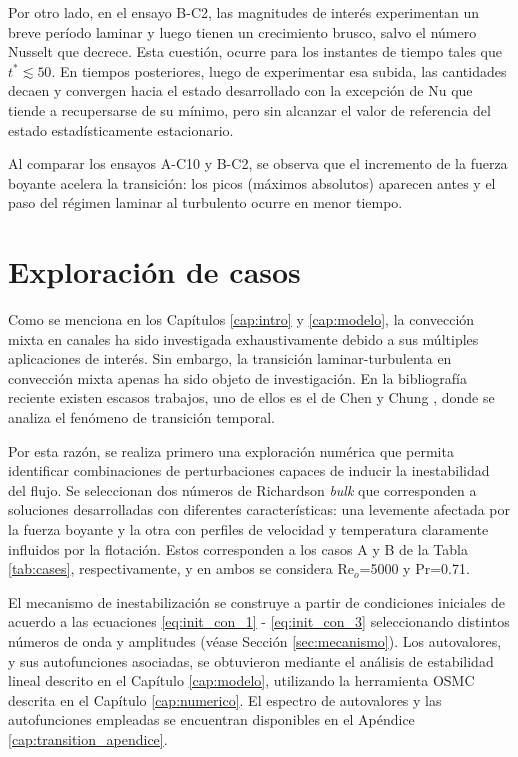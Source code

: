 Por otro lado, en el ensayo B-C2, las magnitudes de interés experimentan un breve período laminar y luego tienen un crecimiento brusco, salvo el número Nusselt que decrece. Esta cuestión, ocurre para los instantes de tiempo tales que $t^*\lesssim 50$. En tiempos posteriores, luego de experimentar esa subida, las cantidades decaen y convergen hacia el estado desarrollado con la excepción de Nu que tiende a recupersarse de su mínimo, pero sin alcanzar el valor de referencia del estado estadísticamente estacionario. 

Al comparar los ensayos A-C10 y B-C2, se observa que el incremento de la fuerza boyante acelera la transición: los picos (máximos absolutos) aparecen antes y el paso del régimen laminar al turbulento ocurre en menor tiempo.

\newpage

\section{Exploración de casos}

Como se menciona en los Capítulos \ref{cap:intro} y \ref{cap:modelo}, la convección mixta en canales ha sido investigada exhaustivamente debido a sus múltiples aplicaciones de interés. Sin embargo, la transición laminar-turbulenta en convección mixta apenas ha sido objeto de investigación. En la bibliografía reciente existen escasos trabajos, uno de ellos es el de Chen y Chung \cite{chen2003direct}, donde se analiza el fenómeno de transición temporal.

Por esta razón, se realiza primero una exploración numérica que permita identificar combinaciones de perturbaciones capaces de inducir la inestabilidad del flujo. Se seleccionan dos números de Richardson \textit{bulk} que corresponden a soluciones desarrolladas con diferentes características: una levemente afectada por la fuerza boyante y la otra con perfiles de velocidad y temperatura claramente influidos por la flotación. Estos corresponden a los casos A y B de la Tabla \ref{tab:cases}, respectivamente, y en ambos se considera Re$_o$=5000 y Pr=0.71.

El mecanismo de inestabilización se construye a partir de condiciones iniciales de acuerdo a las ecuaciones \ref{eq:init_con_1} - \ref{eq:init_con_3} seleccionando distintos números de onda y amplitudes (véase Sección \ref{sec:mecanismo}). Los autovalores, y sus autofunciones asociadas, se obtuvieron mediante el análisis de estabilidad lineal descrito en el Capítulo \ref{cap:modelo}, utilizando la herramienta OSMC descrita en el Capítulo \ref{cap:numerico}. El espectro de autovalores y las autofunciones empleadas se encuentran disponibles en el Apéndice \ref{cap:transition_apendice}. 

